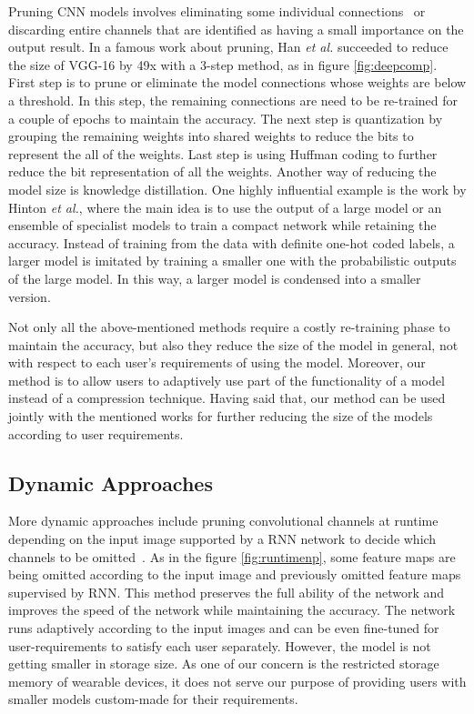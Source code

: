 Pruning CNN models involves eliminating some individual connections~\cite{molchanov2016pruning} \cite{Yu_2018_CVPR}\cite{Wang2018StructuredPP} or discarding entire channels \cite{He_2017_ICCV}\cite{li2016pruning} that are identified as having a small importance on the output result.
In a famous work about pruning\cite{han2015deep}, Han \emph{et al.} succeeded to reduce the size of VGG-16 by 49x with a 3-step method, as in figure \ref{fig:deepcomp}. 
First step is to prune or eliminate the model connections whose weights are below a threshold. 
In this step, the remaining connections are need to be re-trained for a couple of epochs to maintain the accuracy.
The next step is quantization by grouping the remaining weights into shared weights to reduce the bits to represent the all of the weights.
Last step is using Huffman coding to further reduce the bit representation of all the weights. 
Another way of reducing the model size is knowledge distillation. 
One highly influential example is the work by Hinton \emph{et al.}, where the main idea is to use the output of a large model or an ensemble of specialist models to train a compact network while retaining the accuracy.
Instead of training from the data with definite one-hot coded labels, a larger model is imitated by training a smaller one with the probabilistic outputs of the large model.
In this way, a larger model is condensed into a smaller version.

Not only all the above-mentioned methods require a costly re-training phase to maintain the accuracy,
but also they reduce the size of the model in general, not with respect to each user's requirements of using the model. 
Moreover, our method is to allow users to adaptively use part of the functionality of a model instead of a compression technique.
Having said that, our method can be used jointly with the mentioned works for further reducing the size of the models according to user requirements.

\subsection*{Dynamic Approaches}

More dynamic approaches include pruning convolutional channels at runtime depending on the input image supported by a RNN network to decide which channels to be omitted~\cite{Lin2017RuntimeNP}. 
As in the figure \ref{fig:runtimenp}, some feature maps are being omitted according to the input image and previously omitted feature maps supervised by RNN.
This method preserves the full ability of the network and improves the speed of the network while maintaining the accuracy. 
The network runs adaptively according to the input images and
can be even fine-tuned for user-requirements to satisfy each user separately.
However, the model is not getting smaller in storage size. 
As one of our concern is the restricted storage memory of wearable devices, it does not serve our purpose of providing users with smaller models custom-made for their requirements. 

